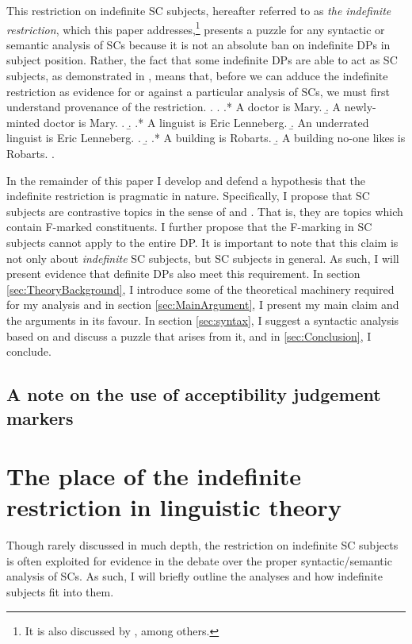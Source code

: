 \documentclass[letterpaper]{article}
\begin{document}
This restriction on indefinite SC subjects, hereafter referred to as \textit{the indefinite restriction}, which this paper addresses,\footnote{
	It is also discussed by \textcite{mikkelsen2005copular,halliday1967notes,higgins1973pseudo,heggie1988diss,heycock1994internal,williams1997asymmetry}, among others.
} presents a puzzle for any syntactic or semantic analysis of SCs because it is not an absolute ban on indefinite DPs in subject position.
Rather, the fact that some indefinite DPs are able to act as SC subjects, as demonstrated in \Next, means that, before we can adduce the indefinite restriction as evidence for or against a particular analysis of SCs, we must first understand provenance of the restriction.
\ex.\label{ex:TheData} 
\a.
\a.* A doctor is Mary.
\b. A newly-minted doctor is Mary.
\z.
\b.
\a.* A linguist is Eric Lenneberg.
\b. An underrated linguist is Eric Lenneberg.
\z.
\b.
\a.* A building is Robarts.
\b. A building no-one likes is Robarts.
\z.

In the remainder of this paper I develop and defend a hypothesis that the indefinite restriction is pragmatic in nature.
Specifically, I propose that SC subjects are contrastive topics in the sense of \textcite{buring2003d} and \textcite{constant2014diss}.
That is, they are topics which contain F-marked constituents.
I further propose that the F-marking in SC subjects cannot apply to the entire DP.
It is important to note that this claim is not only about \textit{indefinite} SC subjects, but SC subjects in general.
As such, I will present evidence that definite DPs also meet this requirement.
In section \ref{sec:TheoryBackground}, I introduce some of the theoretical machinery required for my analysis and in section \ref{sec:MainArgument}, I present my main claim and the arguments in its favour.
In section \ref{sec:syntax}, I suggest a syntactic analysis based on \textcite{constant2014diss} and discuss a puzzle that arises from it, and in \ref{sec:Conclusion}, I conclude.
\subsection{A note on the use of acceptibility judgement markers}

\section{The place of the indefinite restriction in linguistic theory}\label{sec:LitReview}
Though rarely discussed in much depth, the restriction on indefinite SC subjects is often exploited for evidence in the debate over the proper syntactic/semantic analysis of SCs.
As such, I will briefly outline the analyses and how indefinite subjects fit into them.
\end{document}

